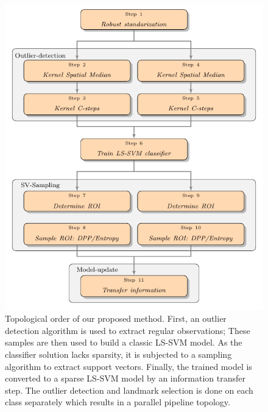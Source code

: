 \documentclass[preprint,12pt]{elsarticle}
\begin{document}
	\begin{figure}[!htb]
		\centering
		\label{fig:pipeline}
		\centering\includegraphics[width=0.8\linewidth]{flow/gabstract.pdf}
		\caption{Topological order of our proposed method. First, an outlier detection algorithm is used to extract regular observations; These samples are then used to build a classic LS-SVM model. As the classifier solution lacks sparsity, it is subjected to a sampling algorithm to extract support vectors. Finally, the trained model is converted to a sparse LS-SVM model by an information transfer step.  The outlier detection and landmark selection is done on each class separately which results in a parallel pipeline topology.} 
	\end{figure}
\end{document}
